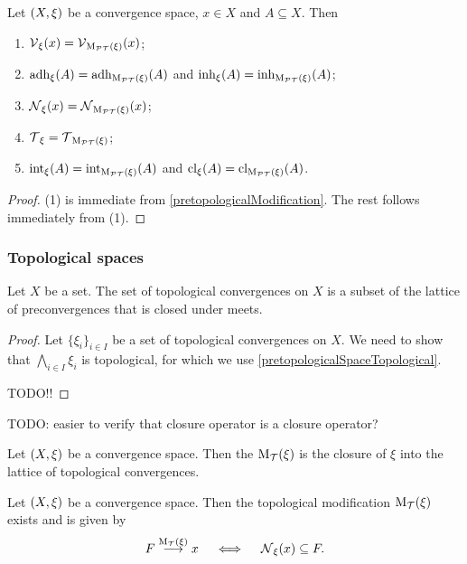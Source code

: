 \begin{lemma}
Let $\left( X,\xi \right)$ be a convergence space, $x\in X$ and $A\subseteq X$. Then
\begin{enumerate}
\item $\operatorname{\mathcal{V}}_{\xi}(x) = \operatorname{\mathcal{V}}_{\operatorname{M_\mathcal{PT}}(\xi)}(x)$;
\item $\operatorname{adh}_\xi(A) = \operatorname{adh}_{\operatorname{M_\mathcal{PT}}(\xi)}(A)$ and $\operatorname{inh}_\xi(A) = \operatorname{inh}_{\operatorname{M_\mathcal{PT}}(\xi)}(A)$;
\item $\operatorname{\mathcal{N}}_{\xi}(x) = \operatorname{\mathcal{N}}_{\operatorname{M_\mathcal{PT}}(\xi)}(x)$;
\item $\operatorname{\mathcal{T}}_{\xi} = \operatorname{\mathcal{T}}_{\operatorname{M_\mathcal{PT}}(\xi)}$;
\item $\operatorname{int}_\xi(A) = \operatorname{int}_{\operatorname{M_\mathcal{PT}}(\xi)}(A)$ and $\operatorname{cl}_\xi(A) = \operatorname{cl}_{\operatorname{M_\mathcal{PT}}(\xi)}(A)$.
\end{enumerate}
\end{lemma}
\begin{proof}
(1) is immediate from \ref{pretopologicalModification}. The rest follows immediately from (1).
\end{proof}


\subsubsection{Topological spaces}
\begin{lemma}
Let $X$ be a set. The set of topological convergences on $X$ is a subset of the lattice of preconvergences that is closed under meets.
\end{lemma}
\begin{proof}
Let $\{\xi_i\}_{i\in I}$ be a set of topological convergences on $X$. We need to show that $\bigwedge_{i\in I}\xi_i$ is topological, for which we use \ref{pretopologicalSpaceTopological}.

TODO!!
\end{proof}
TODO: easier to verify that closure operator is a closure operator?

\begin{definition}
Let $\left( X,\xi \right)$ be a convergence space. Then the  $\operatorname{M_\mathcal{T}}(\xi)$ is the closure of $\xi$ into the lattice of topological convergences.
\end{definition}

\begin{proposition} \label{topologicalModificationConstruction}
Let $\left( X,\xi \right)$ be a convergence space. Then the topological modification $\operatorname{M_\mathcal{T}}(\xi)$ exists and is given by
\[ F \overset{\operatorname{M_\mathcal{T}}(\xi)}{\longrightarrow} x \quad\iff\quad \operatorname{\mathcal{N}}_\xi(x) \subseteq F. \]
\end{proposition}

